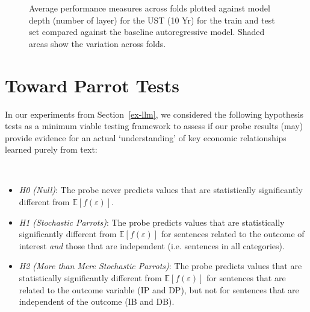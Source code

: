 
\begin{figure}


\caption{\label{fig-ust-10-b}Average performance measures across folds plotted against model depth (number of layer) for the UST (10 Yr) for the train and test set compared against the baseline autoregressive model. Shaded areas show the variation across folds.}

\end{figure}%

\section{Toward Parrot Tests}\label{appendix:parrot}

In our experiments from Section~\ref{ex-llm}, we considered the following hypothesis tests as a minimum viable testing framework to assess if our probe results (may) provide evidence for an actual `understanding' of key economic relationships learned purely from text:

\begin{proposition}\protect\hypertarget{prp-line}{}\label{prp-line}

~

\begin{itemize}
\setlength\itemsep{1px}
\item
  \emph{H0 (Null)}: The probe never predicts values that are statistically significantly different from \(\mathbb{E}[f(\varepsilon)]\).
\item
  \emph{H1 (Stochastic Parrots)}: The probe predicts values that are statistically significantly different from \(\mathbb{E}[f(\varepsilon)]\) for sentences related to the outcome of interest \emph{and} those that are independent (i.e. sentences in all categories).
\item
  \emph{H2 (More than Mere Stochastic Parrots)}: The probe predicts values that are statistically significantly different from \(\mathbb{E} [f(\varepsilon)]\) for sentences that are related to the outcome variable (IP and DP), but not for sentences that are independent of the outcome (IB and DB).
\end{itemize}
\end{proposition}


